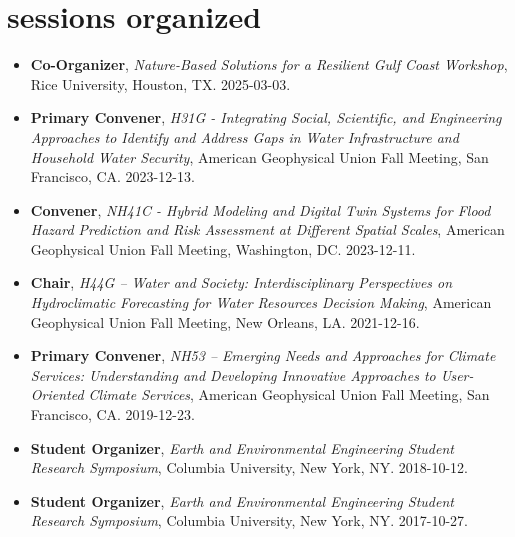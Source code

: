 \documentclass[10pt,oneside]{article}
\begin{document}

\section{sessions organized}

\mbox{}\vspace{-\dimexpr\baselineskip\relax}

\begin{itemize}[label={}]
  
  \item \textbf{Co-Organizer}, \textit{Nature-Based Solutions for a Resilient Gulf Coast Workshop}, Rice University, Houston, TX. 2025-03-03.
        
  \item \textbf{Primary Convener}, \textit{H31G - Integrating Social, Scientific, and Engineering Approaches to Identify and Address Gaps in Water Infrastructure and Household Water Security}, American Geophysical Union Fall Meeting, San Francisco, CA. 2023-12-13.
        
  \item \textbf{Convener}, \textit{NH41C - Hybrid Modeling and Digital Twin Systems for Flood Hazard Prediction and Risk Assessment at Different Spatial Scales}, American Geophysical Union Fall Meeting, Washington, DC. 2023-12-11.
        
  \item \textbf{Chair}, \textit{H44G -- Water and Society: Interdisciplinary Perspectives on Hydroclimatic Forecasting for Water Resources Decision Making}, American Geophysical Union Fall Meeting, New Orleans, LA. 2021-12-16.
        
  \item \textbf{Primary Convener}, \textit{NH53 -- Emerging Needs and Approaches for Climate Services: Understanding and Developing Innovative Approaches to User-Oriented Climate Services}, American Geophysical Union Fall Meeting, San Francisco, CA. 2019-12-23.
        
  \item \textbf{Student Organizer}, \textit{Earth and Environmental Engineering Student Research Symposium}, Columbia University, New York, NY. 2018-10-12.
        
  \item \textbf{Student Organizer}, \textit{Earth and Environmental Engineering Student Research Symposium}, Columbia University, New York, NY. 2017-10-27.
        
\end{itemize}
\end{document}
